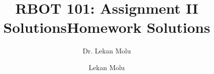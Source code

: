 \documentclass[10 pt, twoside]{IEEEtran}
\title{RBOT 101: Assignment II Solutions}
\author{Dr. Lekan Molu}
\theoremstyle{remark}
\theoremstyle{definition}
\begin{document}
	\maketitle
	
	
	\title{Homework Solutions}
	 
	\author{Lekan Molu}


%
%

\providecommand\BIBentryALTinterwordstretchfactor{2.5}

	
\end{document}
